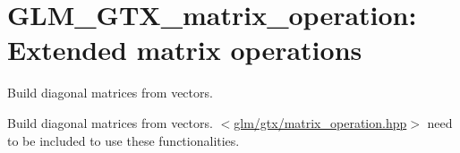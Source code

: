 \hypertarget{group__gtx__matrix__operation}{\section{\-G\-L\-M\-\_\-\-G\-T\-X\-\_\-matrix\-\_\-operation\-: \-Extended matrix operations}
\label{group__gtx__matrix__operation}
}


\-Build diagonal matrices from vectors.  


\-Build diagonal matrices from vectors. $<$\hyperlink{matrix__operation_8hpp}{glm/gtx/matrix\-\_\-operation.\-hpp}$>$ need to be included to use these functionalities. 